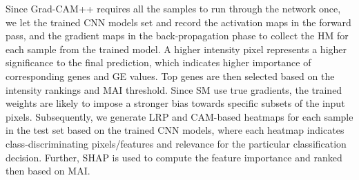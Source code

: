 \hspace*{3.5mm} Since Grad-CAM++ requires all the samples to run through the network once, we let the trained CNN models set and record the activation maps in the forward pass, and the gradient maps in the back-propagation phase to collect the HM for each sample from the trained model. A higher intensity pixel represents a higher significance to the final prediction, which indicates higher importance of corresponding genes and GE values. Top genes are then selected based on the intensity rankings and MAI threshold. Since SM use true gradients, the trained weights are likely to impose a stronger bias towards specific subsets of the input pixels. Subsequently, we generate LRP and CAM-based heatmaps for each sample in the test set based on the trained CNN models, where each heatmap indicates class-discriminating pixels/features and relevance for the particular classification decision. Further, SHAP is used to compute the feature importance and ranked then based on MAI. 

